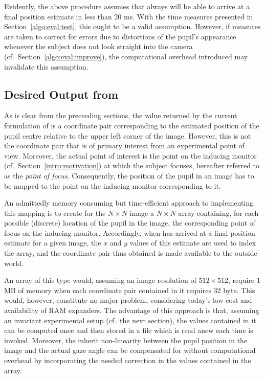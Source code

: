Evidently, the above procedure assumes that {\octopus} always will be
able to arrive at a final position estimate in less than 20 ms.  With
the time measures presented in Section~\ref{algo:eval:test}, this
ought to be a valid assumption.  However, if measures are taken to
correct for errors due to distortions of the pupil's appearance
whenever the subject does not look straight into the camera (cf.\ 
Section~\ref{algo:eval:improve}), the computational overhead
introduced may invalidate this assumption.

\subsection{Desired Output from {\octopus}}
\label{algo:future:output}

As is clear from the preceeding sections, the value returned by the
current formulation of {\octopus} is a coordinate pair corresponding
to the estimated position of the pupil centre relative to the upper
left corner of the image.  However, this is not the coordinate pair
that is of primary interest from an experimental point of view.
Moreover, the actual point of interest is the point on the inducing
monitor (cf.\ Section~\ref{intro:motivation}) at which the subject
focuses, hereafter referred to as the {\em point of focus\/}.
Consequently, the position of the pupil in an image has to be mapped
to the point on the inducing monitor corresponding to it.

An admittedly memory consuming but time-efficient approach to
implementing this mapping is to create for the $N\times N$ image a
$N\times N$ array containing, for each possible (discrete) location of
the pupil in the image, the corresponding point of focus on the
inducing monitor.  Accordingly, when {\octopus} has arrived at a final
position estimate for a given image, the $x$ and $y$ values of this
estimate are used to index the array, and the coordinate pair thus
obtained is made available to the outside world.

An array of this type would, assuming an image resolution of
$512\times 512$, require 1 MB of memory when each coordinate pair
contained in it requires 32 byte.  This would, however, constitute no
major problem, considering today's low cost and availability of RAM
expanders.  The advantage of this approach is that, assuming an
invariant experimental setup (cf.\ the next section), the values
contained in it can be computed once and then stored in a file which
is read anew each time {\octopus} is invoked.  Moreover, the inherit
non-linearity between the pupil position in the image and the actual
gaze angle can be compensated for without computational overhead by
incorporating the needed correction in the values contained in the
array.

